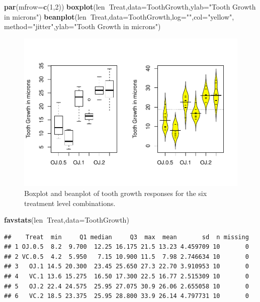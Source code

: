 \documentclass[]{book}
\newenvironment{Shaded}{\begin{snugshade}}{\end{snugshade}}
\newcommand{\KeywordTok}[1]{\textcolor[rgb]{0.13,0.29,0.53}{\textbf{#1}}}
\newcommand{\DataTypeTok}[1]{\textcolor[rgb]{0.13,0.29,0.53}{#1}}
\newcommand{\DecValTok}[1]{\textcolor[rgb]{0.00,0.00,0.81}{#1}}
\newcommand{\StringTok}[1]{\textcolor[rgb]{0.31,0.60,0.02}{#1}}
\newcommand{\OperatorTok}[1]{\textcolor[rgb]{0.81,0.36,0.00}{\textbf{#1}}}
\newcommand{\NormalTok}[1]{#1}
\theoremstyle{definition}
\theoremstyle{definition}
\theoremstyle{remark}
\begin{document}
\begin{Shaded}
\begin{Highlighting}[]
\KeywordTok{par}\NormalTok{(}\DataTypeTok{mfrow=}\KeywordTok{c}\NormalTok{(}\DecValTok{1}\NormalTok{,}\DecValTok{2}\NormalTok{))}
\KeywordTok{boxplot}\NormalTok{(len}\OperatorTok{~}\NormalTok{Treat,}\DataTypeTok{data=}\NormalTok{ToothGrowth,}\DataTypeTok{ylab=}\StringTok{"Tooth Growth in microns"}\NormalTok{)}
\KeywordTok{beanplot}\NormalTok{(len}\OperatorTok{~}\NormalTok{Treat,}\DataTypeTok{data=}\NormalTok{ToothGrowth,}\DataTypeTok{log=}\StringTok{""}\NormalTok{,}\DataTypeTok{col=}\StringTok{"yellow"}\NormalTok{,}
         \DataTypeTok{method=}\StringTok{"jitter"}\NormalTok{,}\DataTypeTok{ylab=}\StringTok{"Tooth Growth in microns"}\NormalTok{)}
\end{Highlighting}
\end{Shaded}

\begin{figure}
\centering
\includegraphics{03-oneWayAnova_files/figure-latex/Figure3-14-1.pdf}
\caption{\label{fig:Figure3-14}Boxplot and beanplot of tooth growth responses for the six
treatment level combinations.}
\end{figure}

\begin{Shaded}
\begin{Highlighting}[]
\KeywordTok{favstats}\NormalTok{(len}\OperatorTok{~}\NormalTok{Treat,}\DataTypeTok{data=}\NormalTok{ToothGrowth)}
\end{Highlighting}
\end{Shaded}

\begin{verbatim}
##    Treat  min     Q1 median     Q3  max  mean       sd  n missing
## 1 OJ.0.5  8.2  9.700  12.25 16.175 21.5 13.23 4.459709 10       0
## 2 VC.0.5  4.2  5.950   7.15 10.900 11.5  7.98 2.746634 10       0
## 3   OJ.1 14.5 20.300  23.45 25.650 27.3 22.70 3.910953 10       0
## 4   VC.1 13.6 15.275  16.50 17.300 22.5 16.77 2.515309 10       0
## 5   OJ.2 22.4 24.575  25.95 27.075 30.9 26.06 2.655058 10       0
## 6   VC.2 18.5 23.375  25.95 28.800 33.9 26.14 4.797731 10       0
\end{verbatim}
\end{document}
